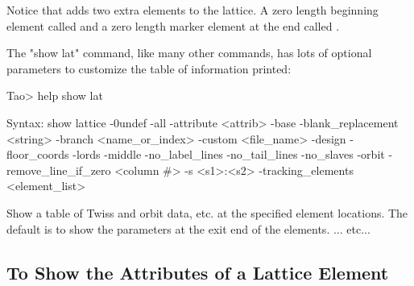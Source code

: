 \documentclass{hitec}
\begin{document}
Notice that \bmad adds two extra elements to the lattice. A zero length beginning element called 
and a zero length marker element at the end called .

The "show lat" command, like many other commands, has lots of optional parameters to customize the
table of information printed:

\begin{code}
Tao> help show lat

Syntax:
  show lattice {-0undef} {-all} {-attribute <attrib>} {-base}
      {-blank_replacement <string>}  {-branch <name_or_index>}
      {-custom <file_name>} {-design} {-floor_coords} {-lords} {-middle}
      {-no_label_lines} {-no_tail_lines} {-no_slaves} {-orbit} 
      {-remove_line_if_zero <column #>} {-s <s1>:<s2>} {-tracking_elements}
      {<element_list>}

Show a table of Twiss and orbit data, etc. at the specified element locations. 
The default is to show the parameters at the exit end of the elements. 
... etc...
\end{code}

\subsection{To Show the Attributes of a Lattice Element}
\end{document}
